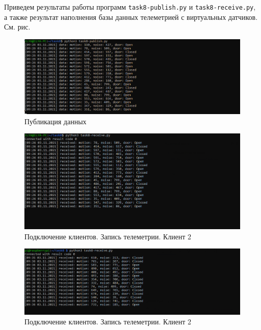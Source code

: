 \documentclass[a4paper,14pt]{extarticle}
\begin{document}
\begin{problem}
	Приведем результаты работы программ \texttt{task8-publish.py} и \texttt{task8-receive.py}, а также результат наполнения базы данных телеметрией с виртуальных датчиков. См. рис. 
	\newpage
	\begin{figure}[htpb]
		\centering
		\includegraphics[width=0.8\linewidth]{images/task8-dop-publish}
		\caption{Публикация данных}
		\label{fig:task8-dop-publish}
	\end{figure}

\begin{figure}[htpb]
	\centering
	\includegraphics[width=0.8\linewidth]{images/task8-dop-receive}
	\caption{Подключение клиентов. Запись телеметрии. Клиент 2}
	\label{fig:task8-dop-receive}
\end{figure}


\begin{figure}[htpb]
	\centering
	\includegraphics[width=0.8\linewidth]{images/task8-dop-receive-2nd-device}
	\caption{Подключение клиентов. Запись телеметрии. Клиент 2}
	\label{fig:task8-dop-receive-2}
\end{figure}



\end{problem}
\end{document}
